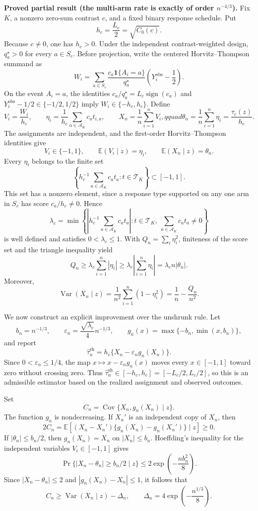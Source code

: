 \textbf{Proved partial result (the multi-arm rate is exactly of order \(n^{-4/3}\)).}
Fix \(K\), a nonzero zero-sum contrast \(c\), and a fixed binary response schedule.  Put
\[
 h_c=\frac{L_c}{2}=\sqrt{C_0(c)}.
\]
Because \(c\neq0\), one has \(h_c>0\).  Under the independent contrast-weighted design, \(q_a^\star>0\) for every \(a\in S_c\).  Before projection, write the centered Horvitz--Thompson summand as
\[
 W_i=\sum_{a\in S_c}
 \frac{c_a\mathbf 1\{A_i=a\}}{q_a^\star}
 \left(Y_i^{\mathrm{obs}}-\frac12\right).
\]
On the event \(A_i=a\), the identities \(c_a/q_a^\star=L_c\operatorname{sign}(c_a)\) and \(Y_i^{\mathrm{obs}}-1/2\in\{-1/2,1/2\}\) imply \(W_i\in\{-h_c,h_c\}\).  Define
\[
 V_i=\frac{W_i}{h_c},\qquad
 \eta_i=\frac{1}{h_c}\sum_{a\in\mathcal A_K}c_at_{i,a},\qquad
 X_n=\frac1n\sum_{i=1}^nV_i,qquad
 \theta_n=\frac1n\sum_{i=1}^n\eta_i=\frac{\tau_c(z)}{h_c}.
\]
The assignments are independent, and the first-order Horvitz--Thompson identities give
\[
 V_i\in\{-1,1\},\qquad
 \mathbb E(V_i\mid z)=\eta_i,\qquad
 \mathbb E(X_n\mid z)=\theta_n.
\]
Every \(\eta_i\) belongs to the finite set
\[
 \left\{h_c^{-1}\sum_{a\in\mathcal A_K}c_at_a:t\in\mathcal T_K\right\}\subset[-1,1].
\]
This set has a nonzero element, since a response type supported on any one arm in \(S_c\) has score \(c_a/h_c\neq0\).  Hence
\[
 \lambda_c=\min\left\{\left|h_c^{-1}\sum_{a\in\mathcal A_K}c_at_a\right|:
 t\in\mathcal T_K,\ \sum_{a\in\mathcal A_K}c_at_a\neq0\right\}
\]
is well defined and satisfies \(0<\lambda_c\leq1\).  With \(Q_n=\sum_i\eta_i^2\), finiteness of the score set and the triangle inequality yield
\[
 Q_n\geq\lambda_c\sum_{i=1}^n|\eta_i|
 \geq\lambda_c\left|\sum_{i=1}^n\eta_i\right|
 =\lambda_c n|\theta_n|.
\]
Moreover,
\[
 \operatorname{Var}(X_n\mid z)
 =\frac1{n^2}\sum_{i=1}^n(1-\eta_i^2)
 =\frac1n-\frac{Q_n}{n^2}.
\]

We now construct an explicit improvement over the unshrunk rule.  Let
\[
 b_n=n^{-1/3},\qquad
 \varepsilon_n=\frac{\sqrt{\lambda_c}}4n^{-1/3},\qquad
 g_n(x)=\max\{-b_n,\min(x,b_n)\},
\]
and report
\[
 \widehat\tau_n^{\mathrm{sh}}
 =h_c\{X_n-\varepsilon_ng_n(X_n)\}.
\]
Since \(0<\varepsilon_n\leq1/4\), the map \(x\mapsto x-\varepsilon_ng_n(x)\) moves every \(x\in[-1,1]\) toward zero without crossing zero.  Thus \(\widehat\tau_n^{\mathrm{sh}}\in[-h_c,h_c]=[-L_c/2,L_c/2]\), so this is an admissible estimator based on the realized assignment and observed outcomes.

Set
\[
 C_n=\operatorname{Cov}\{X_n,g_n(X_n)\mid z\}.
\]
The function \(g_n\) is nondecreasing.  If \(X_n'\) is an independent copy of \(X_n\), then
\[
 2C_n=\mathbb E\left[(X_n-X_n')\{g_n(X_n)-g_n(X_n')\}\mid z\right]\geq0.
\]
If \(|\theta_n|\leq b_n/2\), then \(g_n(X_n)=X_n\) on \(|X_n|\leq b_n\).  Hoeffding's inequality for the independent variables \(V_i\in[-1,1]\) gives
\[
 \Pr\{|X_n-\theta_n|\geq b_n/2\mid z\}
 \leq2\exp\left(-\frac{nb_n^2}{8}\right).
\]
Since \(|X_n-\theta_n|\leq2\) and \(|g_n(X_n)-X_n|\leq1\), it follows that
\[
 C_n\geq\operatorname{Var}(X_n\mid z)-\Delta_n,
 \qquad
 \Delta_n=4\exp\left(-\frac{n^{1/3}}8\right).
\]

